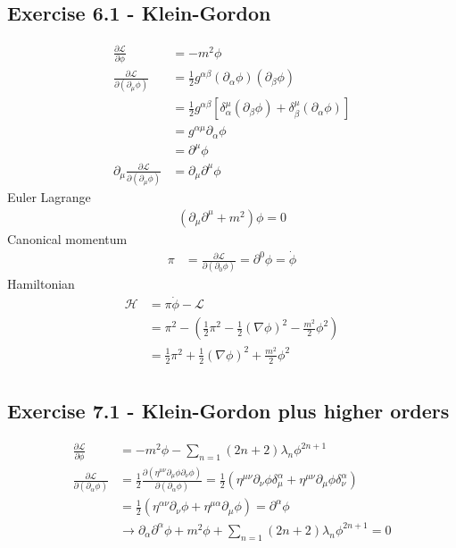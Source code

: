 \documentclass[../main.tex]{subfiles}
\begin{document}
\subsection*{Exercise 6.1 - Klein-Gordon}
\begin{align}
\frac{\partial\mathcal{L}}{\partial\phi}&=-m^2\phi\\
\frac{\partial\mathcal{L}}{\partial(\partial_\mu\phi)}&=\frac{1}{2}g^{\alpha\beta}(\partial_\alpha\phi)(\partial_\beta\phi)\\
&=\frac{1}{2}g^{\alpha\beta}\left[\delta^\mu_\alpha(\partial_\beta\phi)+\delta^\mu_\beta(\partial_\alpha\phi)\right]\\
&=g^{\alpha\mu}\partial_\alpha\phi\\
&=\partial^\mu\phi\\
\partial_\mu\frac{\partial\mathcal{L}}{\partial(\partial_\mu\phi)}&=\partial_\mu\partial^\mu\phi
\end{align}
Euler Lagrange
\begin{align}
(\partial_\mu\partial^\mu+m^2)\phi=0
\end{align}
Canonical momentum
\begin{align}
\pi&=\frac{\partial\mathcal{L}}{\partial(\partial_0\phi)}=\partial^0\phi=\dot{\phi}
\end{align}
Hamiltonian
\begin{align}
\mathcal{H}&=\pi\dot{\phi}-\mathcal{L}\\
&=\pi^2-\left(\frac{1}{2}\pi^2-\frac{1}{2}(\nabla\phi)^2-\frac{m^2}{2}\phi^2\right)\\
&=\frac{1}{2}\pi^2+\frac{1}{2}(\nabla\phi)^2+\frac{m^2}{2}\phi^2\\
\end{align}

\subsection*{Exercise 7.1 - Klein-Gordon plus higher orders}
\begin{align}
\frac{\partial\mathcal{L}}{\partial\phi}
&=-m^2\phi-\sum_{n=1}(2n+2)\lambda_n\phi^{2n+1}\\
\frac{\partial\mathcal{L}}{\partial(\partial_\alpha\phi)}
&=\frac{1}{2}\frac{\partial(\eta^{\mu\nu}\partial_\mu\phi\partial_\nu\phi)}{\partial(\partial_\alpha\phi)}
=\frac{1}{2}(\eta^{\mu\nu}\partial_\nu\phi\delta_\mu^\alpha+\eta^{\mu\nu}\partial_\mu\phi\delta_\nu^\alpha)\\
&=\frac{1}{2}(\eta^{\alpha\nu}\partial_\nu\phi+\eta^{\mu\alpha}\partial_\mu\phi)=\partial^\alpha\phi\\
&\rightarrow\partial_\alpha\partial^\alpha\phi+m^2\phi+\sum_{n=1}(2n+2)\lambda_n\phi^{2n+1}=0
\end{align}
\end{document}

